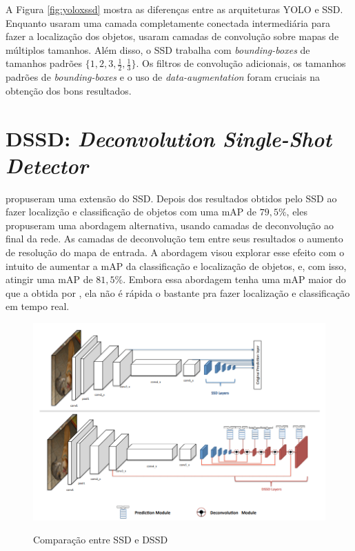 A Figura \ref{fig:yoloxssd} mostra as diferenças entre as arquiteturas \ac{YOLO} e \ac{SSD}. Enquanto  usaram uma camada completamente conectada intermediária para fazer a localização dos objetos,  usaram camadas de convolução sobre mapas de múltiplos tamanhos. Além disso, o \ac{SSD} trabalha com \textit{bounding-boxes} de tamanhos padrões $\{1, 2, 3, \frac{1}{2}, \frac{1}{3}\}$. Os filtros de convolução adicionais, os tamanhos padrões de \textit{bounding-boxes} e o uso de \textit{data-augmentation} foram cruciais na obtenção dos bons resultados.

\section{DSSD: \textit{Deconvolution Single-Shot Detector}}
\label{secao:3:3}

 propuseram uma extensão do \ac{SSD}. Depois dos resultados obtidos pelo \ac{SSD} ao fazer localizção e classificação de objetos com uma \ac{mAP} de $79,5\%$, eles propuseram uma abordagem alternativa, usando camadas de deconvolução ao final da rede. As camadas de deconvolução tem entre seus resultados o aumento de resolução do mapa de entrada. A abordagem visou explorar esse efeito com o intuito de aumentar a \ac{mAP} da classificação e localização de objetos, e, com isso, atingir uma \ac{mAP} de $81,5\%$. Embora essa abordagem tenha uma \ac{mAP} maior do que a obtida por , ela não é rápida o bastante pra fazer localização e classificação em tempo real.


\begin{figure}[H]
	\setlength{\abovecaptionskip}{0pt}
	\setlength{\belowcaptionskip}{0pt}
	\caption[SSD e DSSD]{Comparação entre \ac{SSD} e \ac{DSSD}}
	\centering
	\includegraphics[width=.8\textwidth]{imagem/0x_comparacao_ssd_dssd.png}
	\captionsetup{justification=centering}
	\label{fig:ssdxdssd}
\end{figure}


